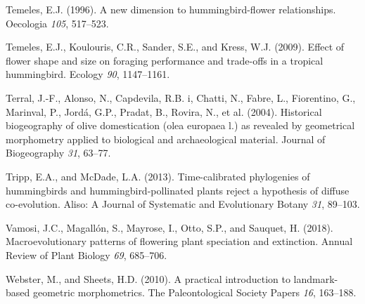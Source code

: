 \documentclass[]{article}
\begin{document}
\leavevmode\hypertarget{ref-temeles_1996}{}%
Temeles, E.J. (1996). A new dimension to hummingbird-flower
relationships. Oecologia \emph{105}, 517--523.

\leavevmode\hypertarget{ref-temeles_2009}{}%
Temeles, E.J., Koulouris, C.R., Sander, S.E., and Kress, W.J. (2009).
Effect of flower shape and size on foraging performance and trade-offs
in a tropical hummingbird. Ecology \emph{90}, 1147--1161.

\leavevmode\hypertarget{ref-terral_2004}{}%
Terral, J.-F., Alonso, N., Capdevila, R.B. i, Chatti, N., Fabre, L.,
Fiorentino, G., Marinval, P., Jordá, G.P., Pradat, B., Rovira, N., et
al. (2004). Historical biogeography of olive domestication (olea
europaea l.) as revealed by geometrical morphometry applied to
biological and archaeological material. Journal of Biogeography
\emph{31}, 63--77.

\leavevmode\hypertarget{ref-tripp_2013}{}%
Tripp, E.A., and McDade, L.A. (2013). Time-calibrated phylogenies of
hummingbirds and hummingbird-pollinated plants reject a hypothesis of
diffuse co-evolution. Aliso: A Journal of Systematic and Evolutionary
Botany \emph{31}, 89--103.

\leavevmode\hypertarget{ref-vamosi_2018}{}%
Vamosi, J.C., Magallón, S., Mayrose, I., Otto, S.P., and Sauquet, H.
(2018). Macroevolutionary patterns of flowering plant speciation and
extinction. Annual Review of Plant Biology \emph{69}, 685--706.

\leavevmode\hypertarget{ref-webster_2010}{}%
Webster, M., and Sheets, H.D. (2010). A practical introduction to
landmark-based geometric morphometrics. The Paleontological Society
Papers \emph{16}, 163--188.
\end{document}
